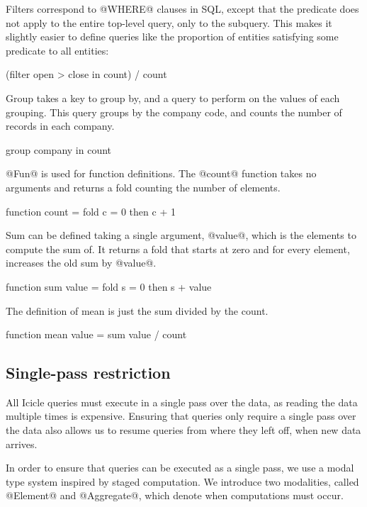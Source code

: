Filters correspond to @WHERE@ clauses in SQL, except that the predicate does not apply to the entire top-level query, only to the subquery.
This makes it slightly easier to define queries like the proportion of entities satisfying some predicate to all entities: 
\begin{code}
(filter open > close in count) / count
\end{code}

Group takes a key to group by, and a query to perform on the values of each grouping.
This query groups by the company code, and counts the number of records in each company.
\begin{code}
group company in count
\end{code}

@Fun@ is used for function definitions.
The @count@ function takes no arguments and returns a fold counting the number of elements.
\begin{code}
function count
 = fold c = 0 then c + 1
\end{code}

Sum can be defined taking a single argument, @value@, which is the elements to compute the sum of.
It returns a fold that starts at zero and for every element, increases the old sum by @value@.
\begin{code}
function sum value
 = fold s = 0 then s + value
\end{code}

The definition of mean is just the sum divided by the count.
\begin{code}
function mean value
 = sum value / count
\end{code}




\subsection{Single-pass restriction}

All Icicle queries must execute in a single pass over the data, as reading the data multiple times is expensive. 
Ensuring that queries only require a single pass over the data also allows us to resume queries from where they left off, when new data arrives.

In order to ensure that queries can be executed as a single pass, we use a modal type system inspired by staged computation\cite{davies2001modal}.
We introduce two modalities, called @Element@ and @Aggregate@, which denote when computations must occur.

